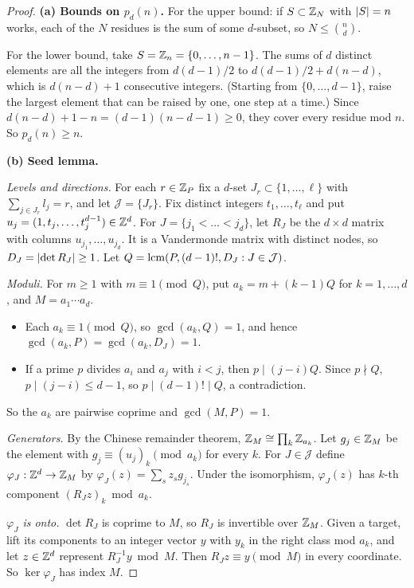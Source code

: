 \begin{proof}
\textbf{(a) Bounds on $p_d(n)$.} For the upper bound: if $S \subset \mathbb{Z}_N$ with $\left|S\right| = n$
works, each of the $N$ residues is the sum of some $d$-subset, so $N \le \binom{n}{d}$.

For the lower bound, take $S = \mathbb{Z}_n = \{0, \dots, n-1\}$. The sums of $d$ distinct elements are
all the integers from $d(d-1)/2$ to $d(d-1)/2 + d(n-d)$, which is $d(n-d) + 1$ consecutive
integers. (Starting from $\{0, \dots, d-1\}$, raise the largest element that can be raised by one,
one step at a time.) Since $d(n-d) + 1 - n = (d-1)(n-d-1) \ge 0$, they cover every residue mod
$n$. So $p_d(n) \ge n$.

\medskip
\textbf{(b) Seed lemma.}

\emph{Levels and directions.} For each $r \in \mathbb{Z}_P$ fix a $d$-set $J_r \subset \{1, \dots, \ell\}$
with $\sum_{j \in J_r} l_j = r$, and let $\mathcal{J} = \{J_r\}$. Fix distinct integers
$t_1, \dots, t_\ell$ and put $u_j = (1, t_j, \dots, t_j^{d-1}) \in \mathbb{Z}^d$. For
$J = \{j_1 < \dots < j_d\}$, let $R_J$ be the $d \times d$ matrix with columns
$u_{j_1}, \dots, u_{j_d}$. It is a Vandermonde matrix with distinct nodes, so
$D_J = \left|\det R_J\right| \ge 1$. Let $Q = \operatorname{lcm}(P, (d-1)!, D_J : J \in \mathcal{J})$.

\emph{Moduli.} For $m \ge 1$ with $m \equiv 1 \pmod{Q}$, put $a_k = m + (k-1)Q$ for
$k = 1, \dots, d$, and $M = a_1 \cdots a_d$.
\begin{itemize}
  \item Each $a_k \equiv 1 \pmod{Q}$, so $\gcd(a_k, Q) = 1$, and hence
    $\gcd(a_k, P) = \gcd(a_k, D_J) = 1$.
  \item If a prime $p$ divides $a_i$ and $a_j$ with $i < j$, then $p \mid (j-i)Q$. Since
    $p \nmid Q$, $p \mid (j-i) \le d-1$, so $p \mid (d-1)! \mid Q$, a contradiction.
\end{itemize}
So the $a_k$ are pairwise coprime and $\gcd(M, P) = 1$.

\emph{Generators.} By the Chinese remainder theorem, $\mathbb{Z}_M \cong \prod_k \mathbb{Z}_{a_k}$. Let
$g_j \in \mathbb{Z}_M$ be the element with $g_j \equiv (u_j)_k \pmod{a_k}$ for every $k$. For
$J \in \mathcal{J}$ define $\varphi_J : \mathbb{Z}^d \to \mathbb{Z}_M$ by $\varphi_J(z) = \sum_s z_s g_{j_s}$.
Under the isomorphism, $\varphi_J(z)$ has $k$-th component $(R_J z)_k \bmod a_k$.

\emph{$\varphi_J$ is onto.} $\det R_J$ is coprime to $M$, so $R_J$ is invertible over $\mathbb{Z}_M$.
Given a target, lift its components to an integer vector $y$ with $y_k$ in the right class mod
$a_k$, and let $z \in \mathbb{Z}^d$ represent $R_J^{-1} y \bmod M$. Then $R_J z \equiv y \pmod{M}$ in every
coordinate. So $\ker \varphi_J$ has index $M$.


\end{proof}
